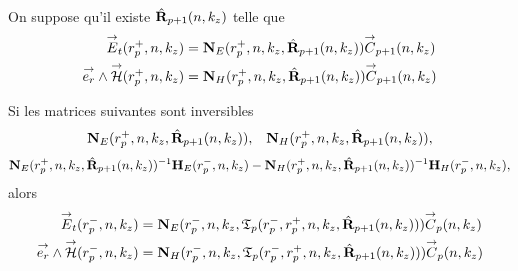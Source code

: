     \begin{prop}%
      \label{prop:cylindre:transfert:reflexion}{}~

      On suppose qu'il existe \(\hat{\mathbf{R}}_{p+1}(n,k_z)\) telle que 
      \begin{align*}
        {\overset{\rightarrow}{E}}_t(r_{p}^+,n,k_z) &= \mathbf{N}_{E}(r_p^+,n,k_z,\hat{\mathbf{R}}_{p+1}(n,k_z)){\overset{\rightarrow}{C}}_{p+1}(n,k_z)
        \\
        {\overset{\rightarrow}{e_r}}\wedge{\overset{\rightarrow}{\mathcal{H}}}(r_{p}^+,n,k_z) &= \mathbf{N}_{H}(r_p^+,n,k_z,\hat{\mathbf{R}}_{p+1}(n,k_z)){\overset{\rightarrow}{C}}_{p+1}(n,k_z)
      \end{align*}

      Si les matrices suivantes sont inversibles
      \begin{align*}
        \mathbf{N}_{E}(r_p^+,n,k_z,\hat{\mathbf{R}}_{p+1}(n,k_z)), && \mathbf{N}_{H}(r_p^+,n,k_z,\hat{\mathbf{R}}_{p+1}(n,k_z)),
      \end{align*}
      \begin{align*}
        \mathbf{N}_{E}(r_p^+,n,k_z,\hat{\mathbf{R}}_{p+1}(n,k_z))^{-1}\mathbf{H}_{E}(r_p^-,n,k_z) - \mathbf{N}_{H}(r_p^+,n,k_z,\hat{\mathbf{R}}_{p+1}(n,k_z))^{-1}\mathbf{H}_{H}(r_p^-,n,k_z),
      \end{align*}
      alors
      \begin{align*}
        {\overset{\rightarrow}{E}}_t(r_{p}^-,n,k_z) &= \mathbf{N}_{E}(r_p^-,n,k_z,\mathfrak{T}_p(r_p^-,r_p^+,n,k_z,\hat{\mathbf{R}}_{p+1}(n,k_z))){\overset{\rightarrow}{C}}_{p}(n,k_z)
        \\
        {\overset{\rightarrow}{e_r}}\wedge{\overset{\rightarrow}{\mathcal{H}}}(r_{p}^-,n,k_z) &= \mathbf{N}_{H}(r_p^-,n,k_z,\mathfrak{T}_p(r_p^-,r_p^+,n,k_z,\hat{\mathbf{R}}_{p+1}(n,k_z))){\overset{\rightarrow}{C}}_{p}(n,k_z)
      \end{align*}
    \end{prop}

